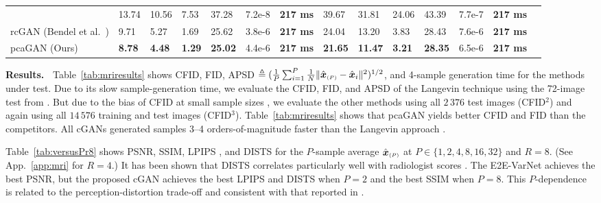 \documentclass{article}
\theoremstyle{plain}
\theoremstyle{definition}
\theoremstyle{remark}
\newcommand{\defn}{\triangleq}
\newcommand{\hvec}[1]{\ensuremath{\Hat{\boldsymbol{#1}}}}
\newcommand{\tabref}[1]{Table~\ref{tab:#1}}
\newcommand{\appref}[1]{App.~\ref{app:#1}}
\newcommand{\avgP}{_{\scriptscriptstyle (P)}}
\begin{document}
\begin{table}[t]
{\begin{tabular}{llllllllllllll}
        & 13.74 & 10.56 & 7.53 & 37.28 & 7.2e-8 & \textbf{217 ms} &
        39.67 & 31.81 & 24.06 & 43.39 & 7.7e-7 & \textbf{217 ms}\\
    rcGAN (Bendel et al.\ \cite{Bendel:NIPS:23}) & 9.71 & 5.27 & 1.69 & 25.62 & 3.8e-6 & \textbf{217 ms}
        & 24.04 & 13.20 & 3.83 & 28.43 & 7.6e-6 & \textbf{217 ms}\\
    pcaGAN (Ours) & \bf 8.78 & \bf 4.48 & \bf 1.29 & \bf 25.02 & 4.4e-6 & \textbf{217 ms} & \bf 21.65 & \bf 11.47 & \bf 3.21 & \bf 28.35 & 6.5e-6 & \textbf{217 ms}\\
    \bottomrule
  \end{tabular}%
  }
\end{table}

\textbf{Results.~} 
\tabref{mriresults} shows CFID, FID, APSD $\defn(\frac{1}{P}\sum_{i=1}^{P} \frac{1}{N}\|\hvec{x}\avgP-\hvec{x}_i\|^2)^{1/2}$, and 4-sample generation time for the methods under test.
Due to its slow sample-generation time, we evaluate the CFID, FID, and APSD of the Langevin technique \cite{Jalal:NIPS:21} using the 72-image test from \cite{Bendel:NIPS:23}.
But due to the bias of CFID at small sample sizes \cite{Soloveitchik:21}, we evaluate the other methods using all $2\,376$ test images (CFID$^2$) and again using all $14\,576$ training and test images (CFID$^3$).
\tabref{mriresults} shows that pcaGAN yields better CFID and FID than the competitors.
All cGANs generated samples 3--4 orders-of-magnitude faster than the Langevin approach \cite{Jalal:NIPS:21}.

\tabref{versusPr8} shows PSNR, SSIM, LPIPS \cite{Zhang:CVPR:18}, and DISTS \cite{Ding:TPAMI:20} for the $P$-sample average $\hvec{x}\avgP$ at $P\in\{1,2,4,8,16,32\}$ and $R=8$. 
(See \appref{mri} for $R=4$.)
It has been shown that DISTS correlates particularly well with radiologist scores \cite{Kastryulin:IA:23}.
The E2E-VarNet achieves the best PSNR, but the proposed cGAN achieves the best LPIPS and DISTS when $P=2$ and the best SSIM when $P=8$. 
This $P$-dependence is related to the perception-distortion trade-off \cite{Blau:CVPR:18} and consistent with that reported in \cite{Bendel:NIPS:23}. 
\end{document}
